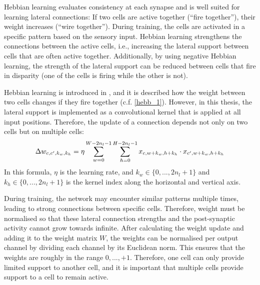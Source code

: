 Hebbian learning evaluates consistency at each synapse and is well suited for learning lateral connections: If two cells are active together (``fire together''), their weight increases (``wire together''). During training, the cells are activated in a specific pattern based on the sensory input. Hebbian learning strengthens the connections between the active cells, i.e., increasing the lateral support between cells that are often active together. Additionally, by using negative Hebbian learning, the strength of the lateral support can be reduced between cells that fire in disparity (one of the cells is firing while the other is not).

Hebbian learning is introduced in , and it is described how the weight between two cells changes if they fire together (c.f. \eqref{hebb_1}).
However, in this thesis, the lateral support is implemented as a convolutional kernel that is applied at all input positions.
Therefore, the update of a connection depends not only on two cells but on multiple cells:
%
\begin{align}\eqlbl{hebbu_1}
	\Delta w_{c, c',k_w,k_h} = \eta \sum_{w = 0}^{W - 2n_l - 1} \sum_{h = 0}^{H - 2n_l - 1} x_{c,w+k_w,h+k_h} \cdot x_{c',w+k_w,h+k_h}
\end{align}
%
In this formula, $\eta$ is the learning rate, and $k_w \in \{0, ..., 2n_l+1\}$ and $k_h\in \{0, ..., 2n_l+1 \}$ is the kernel index along the horizontal and vertical axis.

During training, the network may encounter similar patterns multiple times, leading to strong connections between specific cells. Therefore, weight must be normalised so that these lateral connection strengths and the post-synaptic activity cannot grow towards infinite. After calculating the weight update and adding it to the weight matrix $W$, the weights can be normalised per output channel by dividing each channel by its Euclidean norm. This ensures that the weights are roughly in the range $0, ..., +1$.
Therefore, one cell can only provide limited support to another cell, and it is important that multiple cells provide support to a cell to remain active.



